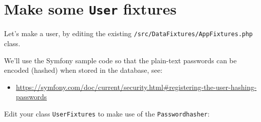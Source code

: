 \documentclass[a4paperpaper,openright]{book}
\providecommand{\tightlist}{%
  \setlength{\itemsep}{0pt}\setlength{\parskip}{0pt}}
\begin{document}
\hypertarget{make-some-user-fixtures}{%
\section{\texorpdfstring{Make some \texttt{User}
fixtures}{Make some User fixtures}}\label{make-some-user-fixtures}}

Let's make a user, by editing the existing
\texttt{/src/DataFixtures/AppFixtures.php} class.

We'll use the Symfony sample code so that the plain-text passwords can
be encoded (hashed) when stored in the database, see:

\begin{itemize}
\tightlist
\item
  \url{https://symfony.com/doc/current/security.html\#registering-the-user-hashing-passwords}
\end{itemize}

Edit your class \texttt{UserFixtures} to make use of the
\texttt{Passwordhasher}:
\end{document}
